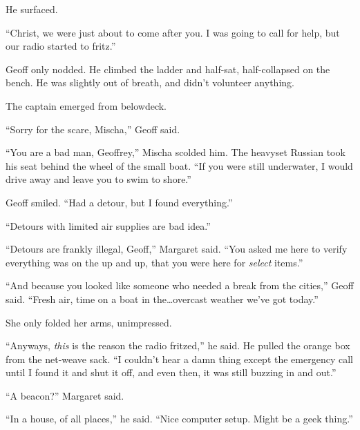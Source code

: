 \sectionbreak



He surfaced.



``Christ, we were just about to come after you.  I was going to call for help, but our radio started to fritz.''



Geoff only nodded.  He climbed the ladder and half-sat, half-collapsed on the bench.  He was slightly out of breath, and didn't volunteer anything.



The captain emerged from belowdeck.



``Sorry for the scare, Mischa,'' Geoff said.



``You are a bad man, Geoffrey,'' Mischa scolded him.  The heavyset Russian took his seat behind the wheel of the small boat.  ``If you were still underwater, I would drive away and leave you to swim to shore.''



Geoff smiled.  ``Had a detour, but I found everything.''



``Detours with limited air supplies are bad idea.''



``Detours are frankly illegal, Geoff,'' Margaret said.  ``You asked me here to verify everything was on the up and up, that you were here for \emph{select} items.''



``And because you looked like someone who needed a break from the cities,'' Geoff said.  ``Fresh air, time on a boat in the\ldots overcast weather we've got today.''



She only folded her arms, unimpressed.



``Anyways, \emph{this} is the reason the radio fritzed,'' he said.  He pulled the orange box from the net-weave sack.  ``I couldn't hear a damn thing except the emergency call until I found it and shut it off, and even then, it was still buzzing in and out.''



``A beacon?''  Margaret said.



``In a house, of all places,'' he said.  ``Nice computer setup.  Might be a geek thing.''



